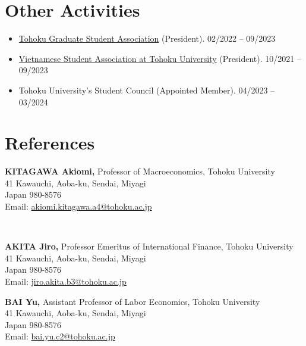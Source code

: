 \documentclass[margin,line]{res}
\begin{document}
\begin{resume}
\section{\sc Other Activities}
\begin{itemize}
\item[] \href{https://inseikaitohoku.org/}{Tohoku Graduate Student Association} (President).  \hfill 02/2022 -- 09/2023
\item[] \href{https://vsatohoku.wordpress.com/}{Vietnamese Student Association at Tohoku University} (President).  \hfill 10/2021 -- 09/2023
\item[] Tohoku University's Student Council (Appointed Member). \hfill 04/2023 -- 03/2024
\end{itemize}


\section{\sc References}
\vspace*{.05in}
\parbox{\textwidth}{
{\bf KITAGAWA Akiomi,} Professor of Macroeconomics, Tohoku University \\
41 Kawauchi, Aoba-ku, Sendai, Miyagi \\
Japan 980-8576 \\
Email: \href{mailto:akiomi.kitagawa.a4@tohoku.ac.jp}{akiomi.kitagawa.a4@tohoku.ac.jp}} \\

\par
\parbox{\textwidth}{
{\bf AKITA Jiro,} Professor Emeritus of International Finance, Tohoku University\\
41 Kawauchi, Aoba-ku, Sendai, Miyagi \\
Japan 980-8576 \\
Email: \href{mailto:jiro.akita.b3@tohoku.ac.jp}{jiro.akita.b3@tohoku.ac.jp}}

\par
\parbox{\textwidth}{
{\bf BAI Yu,} Assistant Professor of Labor Economics, Tohoku University\\
41 Kawauchi, Aoba-ku, Sendai, Miyagi \\
Japan 980-8576 \\
Email: \href{mailto:bai.yu.c2tohoku.ac.jp}{bai.yu.c2@tohoku.ac.jp}}


\end{resume}
\end{document}

